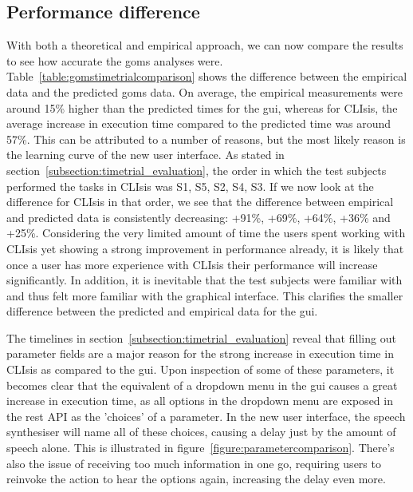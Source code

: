 \subsection{Performance difference}
\label{subsection:performancedifference}
With both a theoretical and empirical approach, we can now compare the results to see how accurate the \acrshort{goms} analyses were. Table~\ref{table:gomstimetrialcomparison} shows the difference between the empirical data and the predicted \acrshort{goms} data. On average, the empirical measurements were around 15\% higher than the predicted times for the \acrshort{gui}, whereas for CLIsis, the average increase in execution time compared to the predicted time was around 57\%. This can be attributed to a number of reasons, but the most likely reason is the learning curve of the new user interface. As stated in section~\ref{subsection:timetrial_evaluation}, the order in which the test subjects performed the tasks in CLIsis was S1, S5, S2, S4, S3. If we now look at the difference for CLIsis in that order, we see that the difference between empirical and predicted data is consistently decreasing: +91\%, +69\%, +64\%, +36\% and +25\%. Considering the very limited amount of time the users spent working with CLIsis yet showing a strong improvement in performance already, it is likely that once a user has more experience with CLIsis their performance will increase significantly. In addition, it is inevitable that the test subjects were familiar with  and thus felt more familiar with the graphical interface. This clarifies the smaller difference between the predicted and empirical data for the \acrshort{gui}. 

The timelines in section~\ref{subsection:timetrial_evaluation} reveal that filling out parameter fields are a major reason for the strong increase in execution time in CLIsis as compared to the \acrshort{gui}. Upon inspection of some of these parameters, it becomes clear that the equivalent of a dropdown menu in the \acrshort{gui} causes a great increase in execution time, as all options in the dropdown menu are exposed in the \acrshort{rest} API as the 'choices' of a parameter. In the new user interface, the speech synthesiser will name all of these choices, causing a delay just by the amount of speech alone. This is illustrated in figure~\ref{figure:parametercomparison}. There's also the issue of receiving too much information in one go, requiring users to reinvoke the action to hear the options again, increasing the delay even more.

